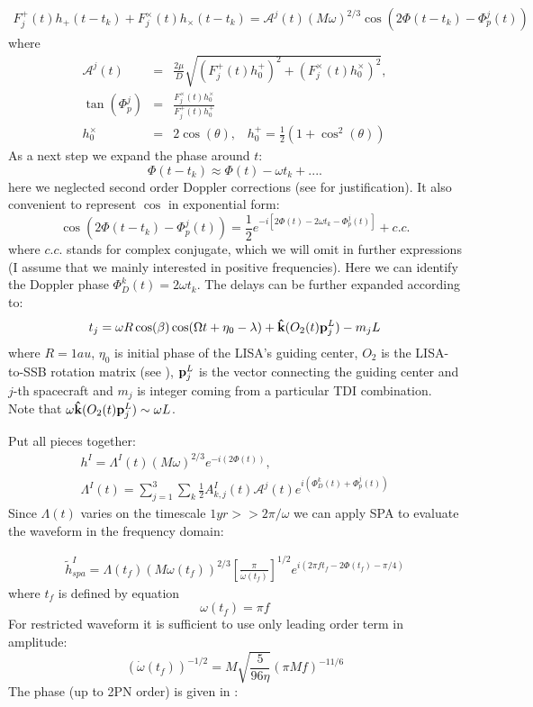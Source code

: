\documentclass[11pt]{report}
\def\be{\begin{equation}}
\def\bea{\begin{eqnarray}}
\def\en{\end{equation}}
\def\ena{\end{eqnarray}}
\def\bk{{\bf \hat{k}}}
\def\bp{{\bf p} }
\begin{document}
\bea
F^{+}_j(t)h_{+}(t-t_k) + F^{\times}_{j}(t)h_{\times}(t-t_k) =
\mathcal{A}^j(t)(M\omega)^{2/3}\cos(2\Phi(t-t_k) -\Phi_p^j(t))
\ena
where
\bea
\mathcal{A}^j(t) &=& \frac{2\mu}{D} \sqrt{(F^{+}_j(t)h^{+}_0)^2 + 
(F^{\times}_{j}(t)h^{\times}_0)^2},\\
\tan(\Phi_p^j) &=& \frac{F^{\times}_{j}(t)h^{\times}_0}
{F^{+}_{j}(t)h^{+}_0}\\
h^{\times}_0 &=& 2\cos(\theta),\;\;\; 
h^{+}_0 = \frac1{2}(1 + \cos^2(\theta))
\ena
As a next step we expand the phase around $t$:
\be
\Phi(t - t_k) \approx \Phi(t) - \omega t_k +....
\en
here we neglected second order Doppler corrections (see \cite{Cutler}
for justification).
It also convenient to represent $\cos$ in exponential form:
\be
\cos(2\Phi(t-t_k) - \Phi_p^j(t)) = \frac1{2}
e^{-i\left[ 2\Phi(t) - 2\omega t_k  - \Phi_p^j(t)\right]} + c.c.
\en
where $c.c.$ stands for complex conjugate, which we will omit 
in further expressions (I assume that we mainly interested in 
positive frequencies).
Here we can identify the Doppler phase $\Phi^k_D(t) = 2\omega t_k$.
The delays can be further expanded according to:
\bea
t_j = \omega R \cos(\beta) \cos(\Omega t + \eta_0 -\lambda) +
\bk(O_2(t)\bp_j^L) - m_jL
\ena
where $R=1au$, $\eta_0$ is initial phase of the LISA's guiding 
center, $O_2$ is the LISA-to-SSB rotation matrix (see \cite{KTV}),
$\bp^L_j$ is the vector connecting the guiding center and $j$-th spacecraft and $m_j$ is integer coming from a particular TDI combination. Note that $\omega \bk(O_2(t)\bp_j^L) \sim \omega L$.

Put all pieces together:
\bea
h^I = \Lambda^I(t) (M\omega)^{2/3}e^{-i(2\Phi(t))},\\
\Lambda^I(t) = \sum_{j=1}^{3}\sum_k \frac1{2}
A_{k,j}^I(t)\mathcal{A}^j(t)e^{i(\Phi_D^k(t) + \Phi_p^j(t))}
\ena
Since $\Lambda(t)$ varies on the timescale $1yr >> 2\pi/\omega$
we can apply SPA to evaluate the waveform in the frequency domain:

\bea
\tilde{h}^I_{spa} = \Lambda(t_f) (M\omega(t_f))^{2/3}
\left[ \frac{\pi}{\dot{\omega}(t_f)} \right]^{1/2}
e^{i(2\pi ft_f - 2\Phi(t_f) - \pi/4)}
\ena
where $t_f$ is defined by equation
\be
\omega(t_f) = \pi f
\en
For restricted waveform it is sufficient to use only leading
order term in amplitude:
\be
(\dot{\omega}(t_f))^{-1/2} = M\sqrt{\frac{5}{96\eta}} 
(\pi Mf)^{-11/6}
\en
The phase (up to 2PN order) is given in \cite{DIS}:
\end{document}
